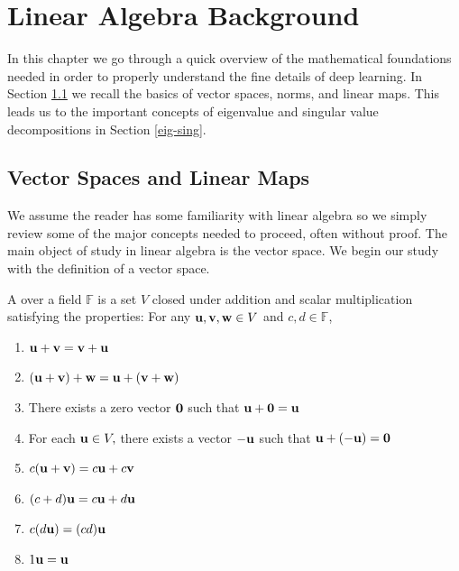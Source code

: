 \pagestyle{fancy} %

\chapter{Linear Algebra Background}


In this chapter we go through a quick overview of the mathematical foundations needed in order to properly understand the fine details of deep learning. In Section \ref{vec-spaces} we recall the basics of vector spaces, norms, and linear maps. This leads us to the important concepts of eigenvalue and singular value decompositions in Section \ref{eig-sing}. 


\section{Vector Spaces and Linear Maps}\label{vec-spaces}

We assume the reader has some familiarity with linear algebra so we simply review some of the major concepts needed to proceed, often without proof. The main object of study in linear algebra is the vector space. We begin our study with the definition of a vector space.

\begin{definition}
A  over a field $\mathbb F$ is a set $V$ closed under addition and scalar multiplication satisfying the properties: For any $\vu, \vv, \vw \in V$ and $c, d \in \mathbb F$,
\begin{enumerate}
\item $\vu + \vv = \vv + \vu$ 
\item $(\vu + \vv) + \vw = \vu + (\vv + \vw)$ 
\item There exists a zero vector $\vzero$ such that $\vu + \vzero = \vu$
\item For each $\vu \in V,$ there exists a vector $-\vu$ such that $\vu + (-\vu) = \vzero$
\item  $c(\vu + \vv) = c\vu + c\vv$
\item $(c+ d) \vu = c\vu + d\vu$
\item $c(d\vu) = (cd) \vu$
\item $1 \vu = \vu$
\end{enumerate}
\end{definition}

